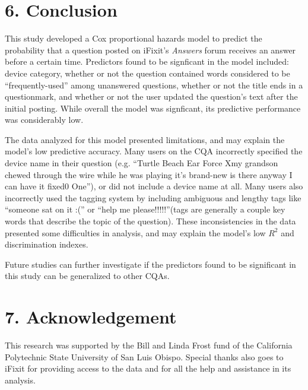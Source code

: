 \documentclass{article}
\begin{document}
\section*{6. Conclusion}

This study developed a Cox proportional hazards model to predict the probability that a question posted on iFixit's \textit{Answers} forum receives an answer before a certain time. Predictors found to be signficant in the model included: device category, whether or not the question contained words considered to be ``frequently-used'' among unanswered questions, whether or not the title ends in a questionmark, and whether or not the user updated the question's text after the initial posting. While overall the model was signficant, its predictive performance was considerably low. 

The data analyzed for this model presented limitations, and may explain the model's low predictive accuracy. Many users on the CQA incorrectly specified the device name in their question (e.g. ``Turtle Beach Ear Force Xmy grandson chewed through the wire while he was playing it's brand-new is there anyway I can have it fixed0 One''), or did not include a device name at all. Many users also incorrectly used the tagging system by including ambiguous and lengthy tags like ``someone sat on it :('' or ``help me please!!!!!''(tags are generally a couple key words that describe the topic of the question). These inconsistencies in the data presented some difficulties in analysis, and may explain the model's low $R^2$ and discrimination indexes. 

Future studies can further investigate if the predictors found to be significant in this study can be generalized to other CQAs. 




\section*{7. Acknowledgement}

This research was supported by the Bill and Linda Frost fund of the California Polytechnic State University of San Luis Obispo. Special thanks also goes to iFixit for providing access to the data and for all the help and assistance in its analysis. 


\end{document}
